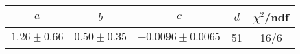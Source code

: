 \begin{tabular}{c|c|c|c|c}
$a$ & $b$ & $c$ & $d$ & $\chi^2$/ndf \\
\hline
$1.26\pm0.66$ & $0.50\pm0.35$ & $-0.0096\pm0.0065$ & 51 & 16/6
\end{tabular}
